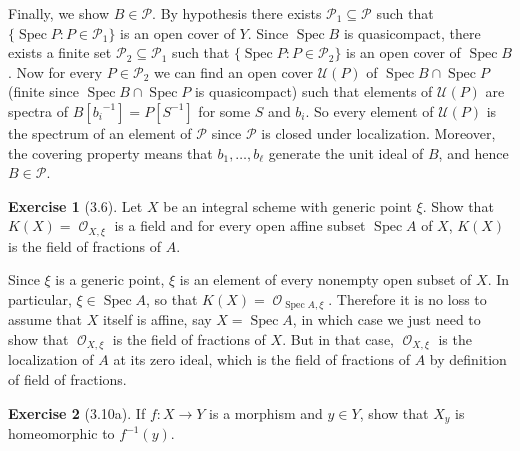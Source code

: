 \documentclass[10pt]{article}
\newcommand{\Spec}{\operatorname{Spec}}
\DeclareMathOperator{\Olo}{\mathscr O}
\theoremstyle{definition}
\newtheorem{exer}{Exercise}
\begin{document}
Finally, we show $B \in \mathcal P$.
By hypothesis there exists $\mathcal P_1 \subseteq \mathcal P$ such that $\{\Spec P: P \in \mathcal P_1\}$ is an open cover of $Y$.
Since $\Spec B$ is quasicompact, there exists a finite set $\mathcal P_2 \subseteq \mathcal P_1$ such that $\{\Spec P: P \in \mathcal P_2\}$ is an open cover of $\Spec B$.
Now for every $P \in \mathcal P_2$ we can find an open cover $\mathcal U(P)$ of $\Spec B \cap \Spec P$ (finite since $\Spec B \cap \Spec P$ is quasicompact) such that elements of $\mathcal U(P)$ are spectra of $B[{b_i}^{-1}] = P[S^{-1}]$ for some $S$ and $b_i$.
So every element of $\mathcal U(P)$ is the spectrum of an element of $\mathcal P$ since $\mathcal P$ is closed under localization.
Moreover, the covering property means that $b_1, \dots, b_\ell$ generate the unit ideal of $B$, and hence $B \in \mathcal P$.

\begin{exer}[3.6]
Let $X$ be an integral scheme with generic point $\xi$.
Show that $K(X) = \Olo_{X, \xi}$ is a field and for every open affine subset $\Spec A$ of $X$, $K(X)$ is the field of fractions of $A$.
\end{exer}

Since $\xi$ is a generic point, $\xi$ is an element of every nonempty open subset of $X$.
In particular, $\xi \in \Spec A$, so that $K(X) = \Olo_{\Spec A, \xi}$.
Therefore it is no loss to assume that $X$ itself is affine, say $X = \Spec A$, in which case we just need to show that $\Olo_{X, \xi}$ is the field of fractions of $X$.
But in that case, $\Olo_{X, \xi}$ is the localization of $A$ at its zero ideal, which is the field of fractions of $A$ by definition of field of fractions.

\begin{exer}[3.10a]
If $f: X \to Y$ is a morphism and $y \in Y$, show that $X_y$ is homeomorphic to $f^{-1}(y)$.
\end{exer}
\end{document}
